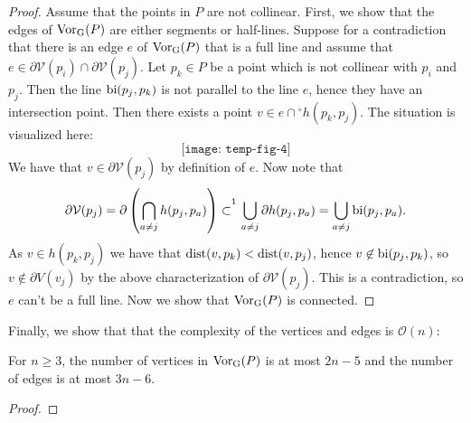 \begin{proof}
Assume that the points in $P$ are not collinear. First, we show that the edges of $\operatorname{Vor_{G}}(P)$ are either segments or half-lines. Suppose for a contradiction that there is an edge $e$ of $\operatorname{Vor_{G}}(P)$ that is a full line and assume that $e \in \partial\mathcal{V}(p_i) \cap \partial\mathcal{V}(p_j)$. Let $p_k \in P$ be a point which is not collinear with $p_i$ and $p_j$. Then the line $\operatorname{bi}(p_j, p_k)$ is not parallel to the line $e$, hence they have an intersection point. Then there exists a point $v \in e \cap {}^{\circ}h(p_k, p_j)$. The situation is visualized here:
\[
    \texttt{[image: temp-fig-4]}
\]
We have that $v \in \partial\mathcal{V}(p_j)$ by definition of $e$. Now note that
\[
    \partial \mathcal{V}(p_j) = \partial \para{\bigcap_{a \ne j} h(p_j, p_a)} \subset^{\footnotemark} \bigcup_{a \ne j} \partial h(p_j, p_a) = \bigcup_{a \ne j} \bi(p_j, p_a).
\]
As $v \in h(p_k, p_j)$ we have that $\operatorname{dist}(v, p_k) < \operatorname{dist}(v, p_j)$, hence $v \not\in \operatorname{bi}(p_j, p_k)$, so $v \not\in \partial{V}(v_j)$ by the above characterization of $\partial \mathcal{V}(p_j)$.
This is a contradiction, so $e$ can't be a full line. Now we show that $\operatorname{Vor_{G}}(P)$ is connected. 
\end{proof}

Finally, we show that that the complexity of the vertices and edges is $\mathcal{O}(n)$:
\begin{thm}
For $n \geq 3$, the number of vertices in $\operatorname{Vor_{G}}(P)$ is at most $2n - 5$ and the number of edges is at most $3n - 6$.
\end{thm}
\begin{proof}
\end{proof}

